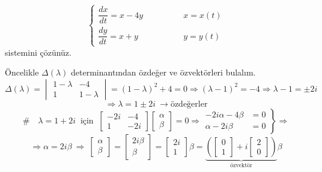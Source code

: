 \documentclass[11pt,a4paper]{article}
\begin{document}
\begin{ornek}[3]
\[
\begin{cases} \dfrac{dx}{dt} = x - 4y & \qquad\qquad x = x(t) \\[3mm] \dfrac{dy}{dt} = x + y & \qquad\qquad y = y(t) \end{cases}
\]
sistemini çözünüz.
\end{ornek}
\begin{cozum}
Öncelikle $\Delta(\lambda)$ determinantından özdeğer ve özvektörleri bulalım.
\[
\Delta(\lambda) = \begin{vmatrix} 1-\lambda & -4 \\ 1 & 1-\lambda \end{vmatrix} = (1-\lambda)^2 + 4 = 0 \Rightarrow (\lambda-1)^2 = -4 \Rightarrow \lambda - 1 = \pm 2i
\]
\[
\Rightarrow \lambda = 1 \pm 2i \ \rightarrow \text{özdeğerler}
\]
\[
\# \quad \lambda = 1+2i \ \text{ için } \ \begin{bmatrix} -2i & -4 \\ 1 & -2i \end{bmatrix}\begin{bmatrix} \alpha \\ \beta \end{bmatrix} = 0 \Rightarrow \left.\begin{aligned} -2i\alpha - 4\beta &= 0 \\ \alpha - 2i\beta &= 0 \end{aligned}\right\} \Rightarrow
\]
\[
\Rightarrow \alpha = 2i\beta \ \Rightarrow \ \begin{bmatrix} \alpha \\ \beta \end{bmatrix} = \begin{bmatrix} 2i\beta \\ \beta \end{bmatrix} = \begin{bmatrix} 2i \\ 1 \end{bmatrix}\beta = \underbrace{\left(\begin{bmatrix} 0 \\ 1 \end{bmatrix} + i\begin{bmatrix} 2 \\ 0 \end{bmatrix}\right)}_{\text{özvektör}}\beta
\]


\end{cozum}
\end{document}
